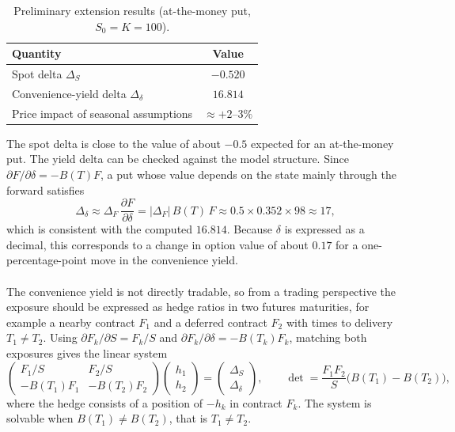 \documentclass[12pt,a4paper]{article}
\begin{document}
\begin{table}[h!]
\centering
\caption{Preliminary extension results (at-the-money put, $S_0=K=100$).}
\label{tab:ext}
\begin{tabular}{lc}
\hline
Quantity & Value \\
\hline
Spot delta $\Delta_S$ & $-0.520$ \\
Convenience-yield delta $\Delta_\delta$ & $16.814$ \\
Price impact of seasonal assumptions & $\approx +2$--$3\%$ \\
\hline
\end{tabular}
\end{table}

The spot delta is close to the value of about $-0.5$ expected for an at-the-money put. The yield delta can be checked against the model structure. Since $\partial F/\partial\delta=-B(T)F$, a put whose value depends on the state mainly through the forward satisfies
\begin{equation}
\Delta_\delta\approx\Delta_F\,\frac{\partial F}{\partial\delta}=|\Delta_F|\,B(T)\,F\approx0.5\times0.352\times98\approx17,
\end{equation}
which is consistent with the computed $16.814$. Because $\delta$ is expressed as a decimal, this corresponds to a change in option value of about $0.17$ for a one-percentage-point move in the convenience yield.\\\\
The convenience yield is not directly tradable, so from a trading perspective the exposure should be expressed as hedge ratios in two futures maturities, for example a nearby contract $F_1$ and a deferred contract $F_2$ with times to delivery $T_1\ne T_2$. Using $\partial F_k/\partial S=F_k/S$ and $\partial F_k/\partial\delta=-B(T_k)F_k$, matching both exposures gives the linear system
\begin{equation}\label{eq:hedge}
\begin{pmatrix}F_1/S & F_2/S\\ -B(T_1)F_1 & -B(T_2)F_2\end{pmatrix}
\begin{pmatrix}h_1\\h_2\end{pmatrix}=\begin{pmatrix}\Delta_S\\\Delta_\delta\end{pmatrix},\qquad
\det=\frac{F_1F_2}{S}\big(B(T_1)-B(T_2)\big),
\end{equation}
where the hedge consists of a position of $-h_k$ in contract $F_k$. The system is solvable when $B(T_1)\neq B(T_2)$, that is $T_1\neq T_2$.
\end{document}
